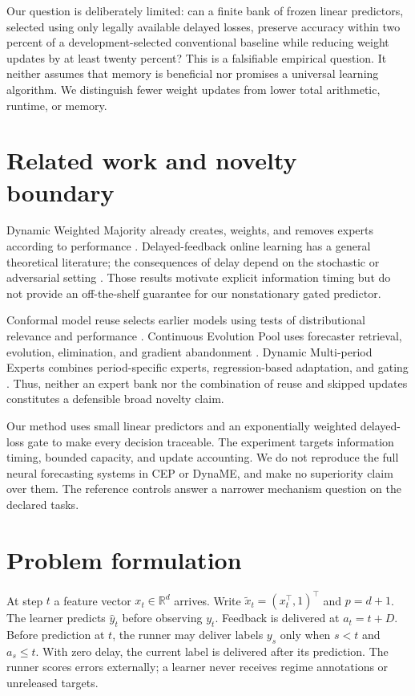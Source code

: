 \documentclass[10pt]{article}
\begin{document}
Our question is deliberately limited: can a finite bank of frozen linear predictors, selected using only legally available delayed losses, preserve accuracy within two percent of a development-selected conventional baseline while reducing weight updates by at least twenty percent? This is a falsifiable empirical question. It neither assumes that memory is beneficial nor promises a universal learning algorithm. We distinguish fewer weight updates from lower total arithmetic, runtime, or memory.

\section{Related work and novelty boundary}
Dynamic Weighted Majority already creates, weights, and removes experts according to performance \cite{dwm}. Delayed-feedback online learning has a general theoretical literature; the consequences of delay depend on the stochastic or adversarial setting \cite{delay}. Those results motivate explicit information timing but do not provide an off-the-shelf guarantee for our nonstationary gated predictor.

Conformal model reuse selects earlier models using tests of distributional relevance and performance \cite{conformal}. Continuous Evolution Pool uses forecaster retrieval, evolution, elimination, and gradient abandonment \cite{cep}. Dynamic Multi-period Experts combines period-specific experts, regression-based adaptation, and gating \cite{dyname}. Thus, neither an expert bank nor the combination of reuse and skipped updates constitutes a defensible broad novelty claim.

Our method uses small linear predictors and an exponentially weighted delayed-loss gate to make every decision traceable. The experiment targets information timing, bounded capacity, and update accounting. We do not reproduce the full neural forecasting systems in CEP or DynaME, and make no superiority claim over them. The reference controls answer a narrower mechanism question on the declared tasks.

\section{Problem formulation}
At step $t$ a feature vector $x_t\in\mathbb R^d$ arrives. Write $\tilde x_t=(x_t^\top,1)^\top$ and $p=d+1$. The learner predicts $\hat y_t$ before observing $y_t$. Feedback is delivered at $a_t=t+D$. Before prediction at $t$, the runner may deliver labels $y_s$ only when $s<t$ and $a_s\leq t$. With zero delay, the current label is delivered after its prediction. The runner scores errors externally; a learner never receives regime annotations or unreleased targets.
\end{document}
